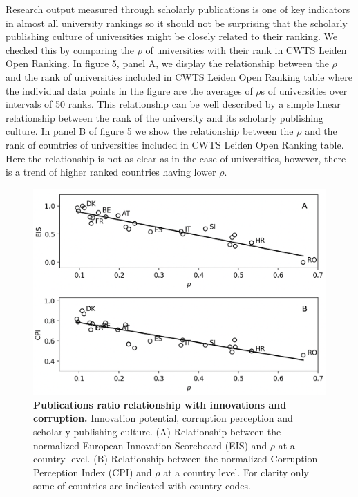 \documentclass[amsfonts, amssymb, prl, superscriptaddress, notitlepage, twocolumn, nofootinbib]{revtex4-2}
\begin{document}
Research output measured through scholarly publications is one of key indicators in almost all university rankings so it should not be surprising that the scholarly publishing culture of universities might be closely related to their ranking. We checked this by comparing the $\rho$ of universities with their rank in CWTS Leiden Open Ranking. In figure 5, panel A, we display the relationship between the $\rho$ and the rank of universities included in CWTS Leiden Open Ranking table where the individual data points in the figure are the averages of $\rho$s of universities over intervals of 50 ranks. This relationship can be well described by a simple linear relationship between the rank of the university and its scholarly publishing culture. In panel B of figure 5 we show the relationship between the $\rho$ and the rank of countries of universities included in CWTS Leiden Open Ranking table. Here the relationship is not as clear as in the case of universities, however, there is a trend of higher ranked countries having lower $\rho$.

\begin{figure}
    \centering
    \includegraphics[width=1.0\linewidth]{Fig04f.png}
    \caption{\label{fig:fig6} {\bf Publications ratio relationship with innovations and corruption.} Innovation potential, corruption perception and scholarly publishing culture. (A) Relationship between the normalized European Innovation Scoreboard (EIS) and $\rho$ at a country level. (B) Relationship between the normalized Corruption Perception Index (CPI) and $\rho$ at a country level. For clarity only some of countries are indicated with country codes.
}
\end{figure}
\end{document}
